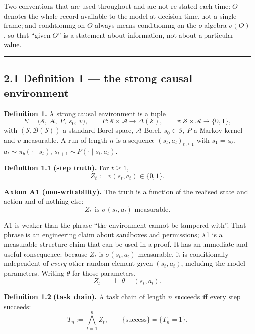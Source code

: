 \documentclass[11pt,a4paper]{article}
\begin{document}
Two conventions that are used throughout and are not re-stated each time:
\(O\) denotes the whole record available to the model at decision time, not a
single frame; and conditioning on \(O\) always means conditioning on the
\(\sigma\)-algebra \(\sigma(O)\), so that ``given \(O\)'' is a statement about
information, not about a particular value.

\begin{center}\rule{0.5\linewidth}{0.5pt}\end{center}

\subsection{2.1 Definition 1 --- the strong causal environment}\label{definition-1-the-strong-causal-environment}

\textbf{Definition 1.} A strong causal environment is a tuple
\[
E=\big(\mathcal S,\ \mathcal A,\ P,\ s_0,\ v\big),
\qquad
P:\mathcal S\times\mathcal A\to\Delta(\mathcal S),
\qquad
v:\mathcal S\times\mathcal A\to\{0,1\},
\]
with \((\mathcal S,\mathcal B(\mathcal S))\) a standard Borel space, \(\mathcal A\)
Borel, \(s_0\in\mathcal S\), \(P\) a Markov kernel and \(v\) measurable. A run of
length \(n\) is a sequence \((s_t,a_t)_{t\ge1}\) with \(s_1=s_0\),
\(a_t\sim\pi_\theta(\cdot\mid s_t)\), \(s_{t+1}\sim P(\cdot\mid s_t,a_t)\).

\textbf{Definition 1.1 (step truth).} For \(t\ge1\),
\[
Z_t:=v(s_t,a_t)\in\{0,1\}.
\]

\textbf{Axiom A1 (non-writability).} The truth is a function of the realised state and
action and of nothing else:
\begin{equation}
Z_t\ \ \text{is}\ \ \sigma(s_t,a_t)\text{-measurable}.
\tag{A1}
\end{equation}

A1 is weaker than the phrase ``the environment cannot be tampered with''. That
phrase is an engineering claim about sandboxes and permissions; A1 is a
measurable-structure claim that can be used in a proof. It has an immediate and
useful consequence: because \(Z_t\) is \(\sigma(s_t,a_t)\)-measurable, it is
conditionally independent of \emph{every} other random element given \((s_t,a_t)\),
including the model parameters. Writing \(\theta\) for those parameters,
\begin{equation}
Z_t\ \perp\!\!\!\perp\ \theta\ \mid\ (s_t,a_t).
\tag{A1.1}
\end{equation}

\textbf{Definition 1.2 (task chain).} A task chain of length \(n\) succeeds iff every
step succeeds:
\begin{equation}
T_n:=\bigwedge_{t=1}^{n}Z_t,
\qquad
\{\text{success}\}=\{T_n=1\}.
\tag{2.1.1}
\end{equation}
\end{document}
